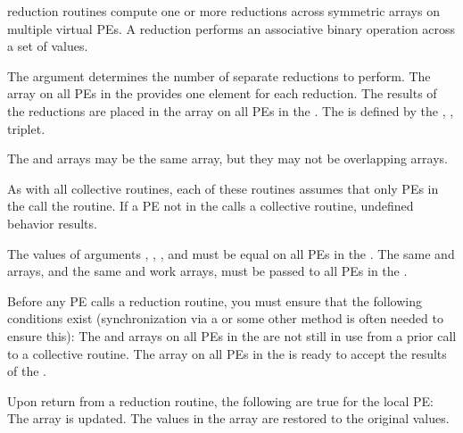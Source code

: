  {  
 \openshmem reduction	routines compute one or more
 reductions across symmetric arrays on multiple virtual \ac{PE}s. A
 reduction performs an associative binary operation across a set of
 values.	 
 
  The  argument determines the number of separate reductions to
 perform. The \source{} array on all \ac{PE}s in the \activeset{} provides one
 element for each reduction. The results of the reductions are placed
 in the \target{} array on all \ac{PE}s in the \activeset. The \activeset{} is
 defined by the , ,  triplet.

 The \source{} and \target{} arrays may be the same array, but they may not be
 overlapping arrays.

 As with all \openshmem{} collective routines, each of these routines assumes
 that only \ac{PE}s in the \activeset{} call the routine. If a \ac{PE} not in the
 \activeset{} calls a \openshmem collective routine, undefined behavior
 results.

 The values of arguments , , , and 
 must be equal on all \ac{PE}s in the \activeset. The same \target{} and \source{}
 arrays, and the same  and  work arrays, must be passed to all
 \ac{PE}s in the \activeset.

 Before any \ac{PE}	calls a reduction routine, you must ensure that the
 following conditions exist (synchronization via a  or some other
 method is often needed to ensure this): The  and  arrays on
 all \ac{PE}s in the \activeset{} are not still in use from a prior call to a
 collective \openshmem{} routine. The \target{} array on all \ac{PE}s in the \activeset{} 
 is ready to accept the results of the .

 Upon return from a reduction routine, the following are true for the
 local \ac{PE}: The \target{} array is updated. The values in the  array
 are restored to the original values.
}
